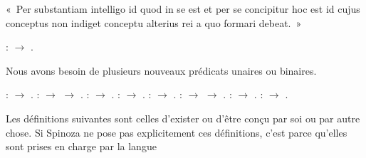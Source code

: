 \documentclass[12pt]{report}
\begin{document}
 « Per substantiam intelligo id quod in se est et per se concipitur
  hoc est id cujus conceptus non indiget conceptu alterius rei a quo
  formari debeat. » \begin{coqdoccode}
\coqdocemptyline
\coqdocindent{1.00em}
 :  \ensuremath{\rightarrow} .\coqdoceol
\coqdocemptyline
\end{coqdoccode}
Nous avons besoin de plusieurs nouveaux prédicats unaires ou
  binaires. \begin{coqdoccode}
\coqdocemptyline
\coqdocindent{1.00em}
 :  \ensuremath{\rightarrow} .\coqdoceol
\coqdocindent{1.00em}
 :  \ensuremath{\rightarrow}  \ensuremath{\rightarrow} .\coqdoceol
\coqdocindent{1.00em}
 :  \ensuremath{\rightarrow} .\coqdoceol
\coqdocindent{1.00em}
 :  \ensuremath{\rightarrow} .\coqdoceol
\coqdocemptyline
\coqdocindent{1.00em}
 :  \ensuremath{\rightarrow} .\coqdoceol
\coqdocindent{1.00em}
 :  \ensuremath{\rightarrow}  \ensuremath{\rightarrow} .\coqdoceol
\coqdocindent{1.00em}
 :  \ensuremath{\rightarrow} .\coqdoceol
\coqdocindent{1.00em}
 :  \ensuremath{\rightarrow} .\coqdoceol
\coqdocemptyline
\end{coqdoccode}
Les définitions suivantes sont celles d'exister ou d'être conçu
  par soi ou par autre chose. Si Spinoza ne pose pas explicitement ces
  définitions, c'est parce qu'elles sont prises en charge par la langue
\end{document}
